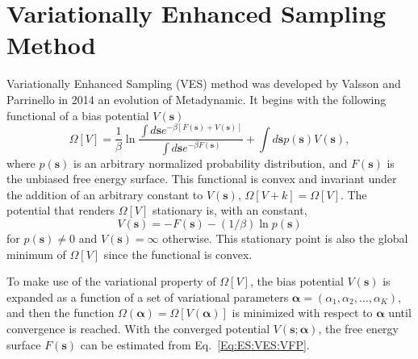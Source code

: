 \section{Variationally Enhanced Sampling Method\label{Sec:ES:VES}}
Variationally Enhanced Sampling (VES) method was developed by Valsson and Parrinello in 2014 an evolution of Metadynamic.\cite{ValssonPRL2014} It begins with the following functional of a bias potential $V(\mathbf{s})$
\begin{equation}
    \Omega[V]=\frac{1}{\beta} \ln \frac{\int d \mathbf{s} e^{-\beta[F(\mathbf{s})+V(\mathbf{s})]}}{\int d \mathbf{s} e^{-\beta F(\mathbf{s})}}+\int d \mathbf{s} p(\mathbf{s}) V(\mathbf{s}),
\end{equation}
where $p(\mathbf{s})$ is an arbitrary normalized probability distribution, and $F(\mathbf{s})$ is the unbiased free energy surface. This functional is convex and invariant under the addition of an arbitrary constant to $V(\mathbf{s})$, $\Omega[V+k]=\Omega[V]$. The potential that renders $\Omega[V]$ stationary is, with an constant,
\begin{equation}
    V(\mathbf{s})=-F(\mathbf{s})-(1/\beta)\ln{p(\mathbf{s})}
    \label{Eq:ES:VES:VFP}
\end{equation}
for $p(\mathbf{s})\neq 0$ and $V(\mathbf{s})=\infty$ otherwise. This stationary point is also the global minimum of $\Omega[V]$ since the functional is convex.

To make use of the variational property of $\Omega[V]$, the bias potential $V(\mathbf{s})$ is expanded as a function of a set of variational parameters $\boldsymbol{\alpha}=(\alpha_1,\alpha_2,\dots,\alpha_K)$, and then the function $\Omega(\boldsymbol{\alpha})=\Omega[V(\boldsymbol{\alpha})]$ is minimized with respect to $\boldsymbol{\alpha}$ until convergence is reached. With the converged potential $V(\mathbf{s};\boldsymbol{\alpha})$, the free energy surface $F(\mathbf{s})$ can be estimated from Eq.~\ref{Eq:ES:VES:VFP}.

